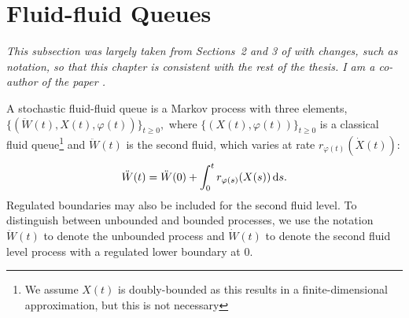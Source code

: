 
\section{Fluid-fluid Queues}\label{sec: ffq intro}
	\label{sec:prelim}
	\begin{center}
		\begin{minipage}{0.8\textwidth}
			\textit{This subsection was largely taken from Sections~2 and 3 of \cite{blnos2022} with changes, such as notation, so that this chapter is consistent with the rest of the thesis. I am a co-author of the paper \cite{blnos2022}. %
			}
		\end{minipage}
		\end{center}

A stochastic fluid-fluid queue \citep{bo2013} is a Markov process with three elements, $\{( \ddot{W}(t),{X}(t), \varphi(t))\}_{t \geq 0},$ where $\{(X(t),\varphi(t))\}_{t\geq 0}$ is a classical fluid queue\footnote{We assume \(X(t)\) is doubly-bounded as this results in a finite-dimensional approximation, but this is not necessary} and $\ddot{W}(t)$ is the second fluid, which varies at rate $r_{\varphi(t)}(\dot{X}(t))$:
% 
\begin{align*} 
	\ddot{W}(t) = \ddot W(0) + \int_0^t r_{\varphi(s)}({X}(s)) \, \mathrm{d} s.
\end{align*} 
% 
Regulated boundaries may also be included for the second fluid level. To distinguish between unbounded and bounded processes, we use the notation \(\ddot W(t)\) to denote the unbounded process and \(\dot W(t)\) to denote the second fluid level process with a regulated lower boundary at 0.


